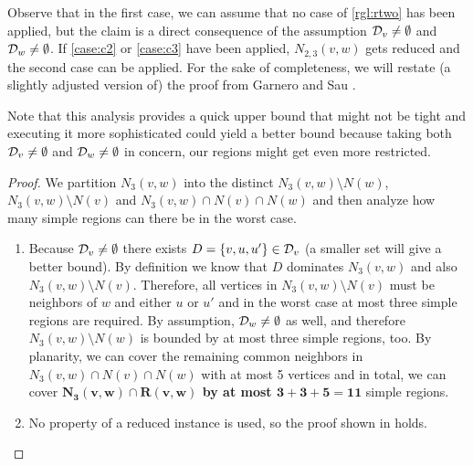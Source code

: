 Observe that in the first case, we can assume that no case of \cref{rgl:rtwo} has been applied, but the claim is a direct consequence of the assumption $\mathcal{D}_{v} \neq \emptyset$ and $\mathcal{D}_{w} \neq \emptyset$. If \cref{case:c2} or \cref{case:c3} have been applied, $N_{2,3}(v,w)$ gets reduced and the second case can be applied. For the sake of completeness, we will restate (a slightly adjusted version of) the proof from Garnero and Sau \cite[Fact 6, arXiv v2]{Garnero2018}. 

Note that this analysis provides a quick upper bound that might not be tight and executing it more sophisticated could yield a better bound because taking both $\mathcal{D}_{v} \neq \emptyset$ and $\mathcal{D}_{w} \neq \emptyset$ in concern, our regions might get even more restricted.

\begin{proof}
        We partition $N_3(v,w)$ into the distinct $N_3(v,w) \setminus N(w)$, $N_3(v,w) \setminus N(v)$ and $N_3(v,w) \cap N(v) \cap N(w)$ and then analyze how many simple regions can there be in the worst case.

    \begin{enumerate}
        \item Because $\mathcal{D}_{v} \neq \emptyset$ there exists $D = \{v,u,u'\} \in \mathcal{D}_{v}$ (a smaller set will give a better bound). By definition we know that $D$ dominates $N_3(v,w)$ and also $N_3(v,w) \setminus N(v)$. Therefore, all vertices in $N_3(v,w) \setminus N(v)$ must be neighbors of $w$ and either $u$ or $u'$ and in the worst case at most three simple regions are required. By assumption, $\mathcal{D}_{w} \neq \emptyset$ as well, and therefore $N_3(v,w) \setminus N(w)$ is bounded by at most three simple regions, too.
        By planarity, we can cover the remaining common neighbors in $N_3(v,w) \cap N(v) \cap N(w)$ with at most 5 vertices and in total, we can cover \textbf{$\mathbf{N_3(v,w) \cap R(v,w)}$ by at most $\mathbf{3 + 3 +5 = 11}$} simple regions.

        \item No property of a reduced instance is used, so the proof shown in \cite{Garnero2018} holds. 

    

\end{enumerate}
\end{proof}

